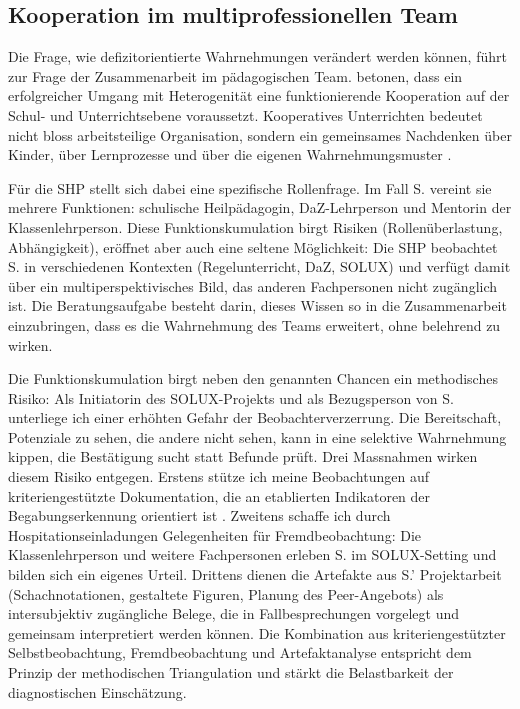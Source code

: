 \documentclass[ngerman, a4paper]{article}
\begin{document}
\subsection{Kooperation im multiprofessionellen Team}

Die Frage, wie defizitorientierte Wahrnehmungen verändert werden können, führt zur
Frage der Zusammenarbeit im pädagogischen Team. \textcite{buholzer2010allegleich} betonen,
dass ein erfolgreicher Umgang mit Heterogenität eine funktionierende Kooperation
auf der Schul- und Unterrichtsebene voraussetzt. Kooperatives Unterrichten bedeutet
nicht bloss arbeitsteilige Organisation, sondern ein gemeinsames Nachdenken über
Kinder, über Lernprozesse und über die eigenen Wahrnehmungsmuster
\parencite{buholzer2010allegleich}.

Für die SHP stellt sich dabei eine spezifische Rollenfrage. Im Fall S. vereint sie
mehrere Funktionen: schulische Heilpädagogin, DaZ-Lehrperson und Mentorin der
Klassenlehrperson. Diese Funktionskumulation birgt Risiken (Rollenüberlastung,
Abhängigkeit), eröffnet aber auch eine seltene Möglichkeit: Die SHP beobachtet S. in
verschiedenen Kontexten (Regelunterricht, DaZ, SOLUX) und verfügt damit über ein
multiperspektivisches Bild, das anderen Fachpersonen nicht zugänglich ist. Die
Beratungsaufgabe besteht darin, dieses Wissen so in die Zusammenarbeit einzubringen,
dass es die Wahrnehmung des Teams erweitert, ohne belehrend zu wirken.

Die Funktionskumulation birgt neben den genannten Chancen ein methodisches
Risiko: Als Initiatorin des SOLUX-Projekts und als Bezugsperson von S.
unterliege ich einer erhöhten Gefahr der Beobachterverzerrung. Die
Bereitschaft, Potenziale zu sehen, die andere nicht sehen, kann in eine
selektive Wahrnehmung kippen, die Bestätigung sucht statt Befunde prüft.
Drei Massnahmen wirken diesem Risiko entgegen. Erstens stütze ich meine
Beobachtungen auf kriteriengestützte Dokumentation, die an etablierten
Indikatoren der Begabungserkennung orientiert ist
\parencite[S.\,34--41]{trautmann2016einfuehrung,muelleroppliger2021paeddiagnostik}. Zweitens
schaffe ich durch Hospitationseinladungen Gelegenheiten für
Fremdbeobachtung: Die Klassenlehrperson und weitere Fachpersonen
erleben S. im SOLUX-Setting und bilden sich ein eigenes Urteil. Drittens
dienen die Artefakte aus S.' Projektarbeit (Schachnotationen, gestaltete
Figuren, Planung des Peer-Angebots) als intersubjektiv zugängliche Belege,
die in Fallbesprechungen vorgelegt und gemeinsam interpretiert werden
können. Die Kombination aus kriteriengestützter Selbstbeobachtung,
Fremdbeobachtung und Artefaktanalyse entspricht dem Prinzip der
methodischen Triangulation und stärkt die Belastbarkeit der diagnostischen
Einschätzung.
\end{document}
